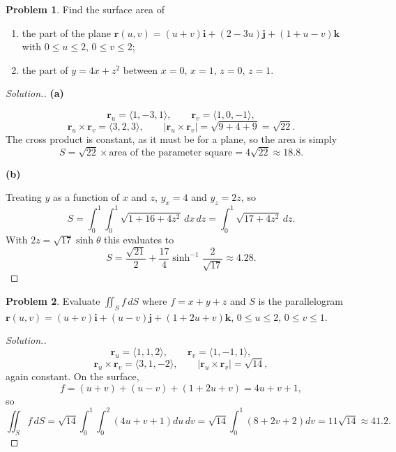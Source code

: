 \documentclass[11pt,a4paper]{article}
\theoremstyle{definition}
\newtheorem{problemx}{Problem}[subsection]
\newenvironment{problem}{\begin{problemx}}{\end{problemx}}
\newenvironment{solution}
  {\renewcommand{\qedsymbol}{}\begin{proof}[\textit{Solution}.]}
  {\end{proof}}
\newcommand{\subhead}[1]{%
  \par\medskip\noindent\textbf{#1}\par\nobreak\smallskip}
\begin{document}
\begin{problem}
Find the surface area of
\begin{enumerate}
\item[(a)] the part of the plane
$\mathbf r(u,v) = (u+v)\mathbf{i} + (2-3u)\mathbf{j} + (1+u-v)\mathbf{k}$
with $0\leq u\leq 2$, $0\leq v\leq 2$;
\item[(b)] the part of $y = 4x+z^2$ between $x=0$, $x=1$, $z=0$, $z=1$.
\end{enumerate}
\end{problem}
\begin{solution}
\subhead{(a)}
\[\mathbf r_u = \langle 1,-3,1\rangle,\qquad
\mathbf r_v = \langle 1,0,-1\rangle ,\]
\[\mathbf r_u\times\mathbf r_v = \langle 3,2,3\rangle,\qquad
\left|\mathbf r_u\times\mathbf r_v\right| = \sqrt{9+4+9} = \sqrt{22}.\]
The cross product is constant, as it must be for a plane, so the area is simply
\[S = \sqrt{22}\times\text{area of the parameter square}
= 4\sqrt{22}\approx 18.8 .\]

\subhead{(b)}
Treating $y$ as a function of $x$ and $z$, $y_x = 4$ and $y_z = 2z$, so
\[S = \int_0^1\int_0^1\sqrt{1+16+4z^2}\,dx\,dz
= \int_0^1\sqrt{17+4z^2}\,dz .\]
With $2z = \sqrt{17}\sinh\theta$ this evaluates to
\[S = \frac{\sqrt{21}}{2} + \frac{17}{4}\sinh^{-1}\frac{2}{\sqrt{17}}
\approx 4.28 .\]
\end{solution}

\begin{problem}
Evaluate $\displaystyle{\iint_S f\,dS}$ where $f = x+y+z$ and $S$ is the
parallelogram $\mathbf r(u,v) = (u+v)\mathbf{i} + (u-v)\mathbf{j}
+ (1+2u+v)\mathbf{k}$, $0\leq u\leq 2$, $0\leq v\leq 1$.
\end{problem}
\begin{solution}
\[\mathbf r_u = \langle 1,1,2\rangle,\qquad
\mathbf r_v = \langle 1,-1,1\rangle ,\]
\[\mathbf r_u\times\mathbf r_v = \langle 3,1,-2\rangle,\qquad
\left|\mathbf r_u\times\mathbf r_v\right| = \sqrt{14},\]
again constant. On the surface,
\[f = (u+v)+(u-v)+(1+2u+v) = 4u+v+1 ,\]
so
\[\iint_S f\,dS = \sqrt{14}\int_0^1\int_0^2(4u+v+1)du\,dv
= \sqrt{14}\int_0^1(8+2v+2)dv = 11\sqrt{14}\approx 41.2 .\]
\end{solution}
\end{document}

